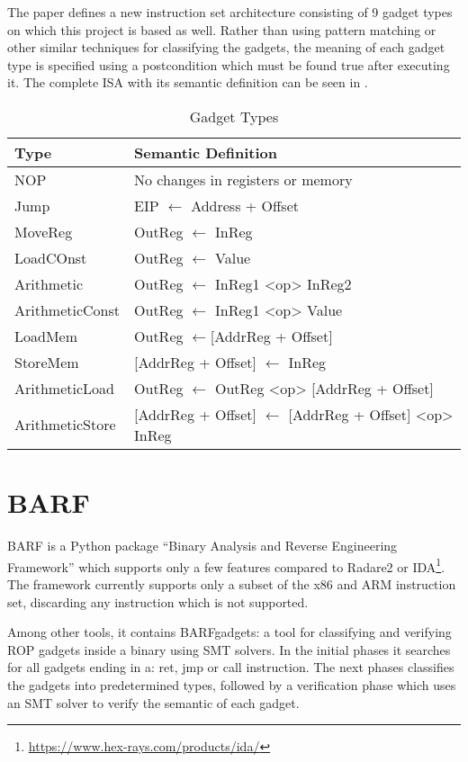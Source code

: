 
The paper\cite{schwartz2011q} defines a new instruction set architecture consisting of 9 gadget types on which this project is based as well. Rather than using pattern matching or other similar techniques for classifying the gadgets, the meaning of each gadget type is specified using a postcondition which must be found true after executing it. The complete ISA with its semantic definition can be seen in .

\begin{table}
	\begin{center}
	\begin{tabular}{ll}
	\toprule
	Type & Semantic Definition \\
	\midrule
	NOP & No changes in registers or memory \\
	Jump & EIP $\leftarrow$ Address + Offset \\
	MoveReg & OutReg $\leftarrow$ InReg \\
	LoadCOnst & OutReg $\leftarrow$ Value \\
	Arithmetic & OutReg $\leftarrow$ InReg1 <op> InReg2 \\
	ArithmeticConst & OutReg $\leftarrow$ InReg1 <op> Value \\
	LoadMem & OutReg $\leftarrow $[AddrReg + Offset] \\
	StoreMem & [AddrReg + Offset] $\leftarrow$ InReg \\
	ArithmeticLoad & OutReg $\leftarrow$ OutReg <op> [AddrReg + Offset] \\
	ArithmeticStore & [AddrReg + Offset] $\leftarrow$ [AddrReg + Offset] <op> InReg \\
	\bottomrule
	\end{tabular}
	\caption{Gadget Types}
	\label{table:gadgetTypes}
	\end{center}
\end{table}


\section{BARF}

BARF\cite{heitman2014barf} is a Python package ``Binary Analysis and Reverse Engineering Framework'' which supports only a few features compared to Radare2 or IDA\footnote{\url{https://www.hex-rays.com/products/ida/}}. The framework currently supports only a subset of the x86 and ARM instruction set, discarding any instruction which is not supported.

Among other tools, it contains BARFgadgets: a tool for classifying and verifying ROP gadgets inside a binary using SMT solvers. In the initial phases it searches for all gadgets ending in a: ret, jmp or call instruction. The next phases classifies the gadgets into predetermined types, followed by a verification phase which uses an SMT solver to verify the semantic of each gadget.
